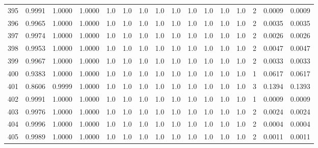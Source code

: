 \begin{tabular}{lrrrrrrrrrrrrrrr}
395 &      0.9991 &  1.0000 &  1.0000 &     1.0 &     1.0 &     1.0 &     1.0 &     1.0 &     1.0 &     1.0 &      1.0 &        1.0 &      2 &                    0.0009 &                     0.0009 \\
396 &      0.9965 &  1.0000 &  1.0000 &     1.0 &     1.0 &     1.0 &     1.0 &     1.0 &     1.0 &     1.0 &      1.0 &        1.0 &      2 &                    0.0035 &                     0.0035 \\
397 &      0.9974 &  1.0000 &  1.0000 &     1.0 &     1.0 &     1.0 &     1.0 &     1.0 &     1.0 &     1.0 &      1.0 &        1.0 &      2 &                    0.0026 &                     0.0026 \\
398 &      0.9953 &  1.0000 &  1.0000 &     1.0 &     1.0 &     1.0 &     1.0 &     1.0 &     1.0 &     1.0 &      1.0 &        1.0 &      2 &                    0.0047 &                     0.0047 \\
399 &      0.9967 &  1.0000 &  1.0000 &     1.0 &     1.0 &     1.0 &     1.0 &     1.0 &     1.0 &     1.0 &      1.0 &        1.0 &      2 &                    0.0033 &                     0.0033 \\
400 &      0.9383 &  1.0000 &  1.0000 &     1.0 &     1.0 &     1.0 &     1.0 &     1.0 &     1.0 &     1.0 &      1.0 &        1.0 &      1 &                    0.0617 &                     0.0617 \\
401 &      0.8606 &  0.9999 &  1.0000 &     1.0 &     1.0 &     1.0 &     1.0 &     1.0 &     1.0 &     1.0 &      1.0 &        1.0 &      3 &                    0.1394 &                     0.1393 \\
402 &      0.9991 &  1.0000 &  1.0000 &     1.0 &     1.0 &     1.0 &     1.0 &     1.0 &     1.0 &     1.0 &      1.0 &        1.0 &      1 &                    0.0009 &                     0.0009 \\
403 &      0.9976 &  1.0000 &  1.0000 &     1.0 &     1.0 &     1.0 &     1.0 &     1.0 &     1.0 &     1.0 &      1.0 &        1.0 &      2 &                    0.0024 &                     0.0024 \\
404 &      0.9996 &  1.0000 &  1.0000 &     1.0 &     1.0 &     1.0 &     1.0 &     1.0 &     1.0 &     1.0 &      1.0 &        1.0 &      2 &                    0.0004 &                     0.0004 \\
405 &      0.9989 &  1.0000 &  1.0000 &     1.0 &     1.0 &     1.0 &     1.0 &     1.0 &     1.0 &     1.0 &      1.0 &        1.0 &      2 &                    0.0011 &                     0.0011 \\

\end{tabular}

